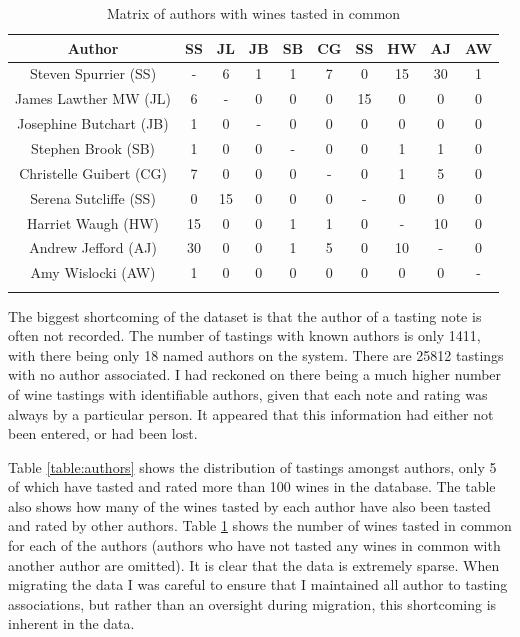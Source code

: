 \begin{table}[ht]
    \caption{Matrix of authors with wines tasted in common}
    \centering
    \begin{tabular}{c c c c c c c c c c}
        \\\hline\hline
        Author                   & SS & JL & JB & SB & CG & SS & HW & AJ & AW
        \\\hline
        Steven Spurrier (SS)     & -  & 6  & 1  & 1  & 7  & 0  & 15 & 30 & 1 \\
        James Lawther MW (JL)    & 6  & -  & 0  & 0  & 0  & 15 & 0  & 0  & 0 \\
        Josephine Butchart (JB)  & 1  & 0  & -  & 0  & 0  & 0  & 0  & 0  & 0 \\
        Stephen Brook (SB)       & 1  & 0  & 0  & -  & 0  & 0  & 1  & 1  & 0 \\
        Christelle Guibert (CG)  & 7  & 0  & 0  & 0  & -  & 0  & 1  & 5  & 0 \\
        Serena Sutcliffe (SS)    & 0  & 15 & 0  & 0  & 0  & -  & 0  & 0  & 0 \\
        Harriet Waugh (HW)       & 15 & 0  & 0  & 1  & 1  & 0  & -  & 10 & 0 \\
        Andrew Jefford (AJ)      & 30 & 0  & 0  & 1  & 5  & 0  & 10 & -  & 0 \\
        Amy Wislocki (AW)        & 1  & 0  & 0  & 0  & 0  & 0  & 0  & 0  & - \\
        \\\hline
    \end{tabular}
    \label{table:authormatrix}
\end{table}

The biggest shortcoming of the dataset is that the author of a tasting note is often not recorded. The number of tastings with known authors is only 1411, with there being only 18 named authors on the system. There are 25812 tastings with no author associated. I had reckoned on there being a much higher number of wine tastings with identifiable authors, given that each note and rating was always by a particular person. It appeared that this information had either not been entered, or had been lost.

Table \ref{table:authors} shows the distribution of tastings amongst authors, only 5 of which have tasted and rated more than 100 wines in the database. The table also shows how many of the wines tasted by each author have also been tasted and rated by other authors. Table \ref{table:authormatrix} shows the number of wines tasted in common for each of the authors (authors who have not tasted any wines in common with another author are omitted). It is clear that the data is extremely sparse. When migrating the data I was careful to ensure that I maintained all author to tasting associations, but rather than an oversight during migration, this shortcoming is inherent in the data. 

